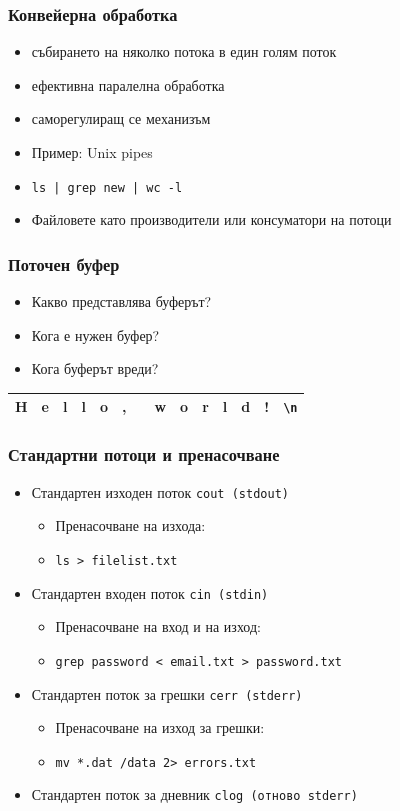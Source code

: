 \documentclass{beamer}
\begin{document}
\begin{frame}
  \frametitle{Конвейерна обработка}

  \begin{itemize}
  \item събирането на няколко потока в един голям поток
  \item ефективна паралелна обработка
  \item саморегулиращ се механизъм
  \item Пример: Unix pipes
  \item \tt{ls | grep new | wc -l}
  \item Файловете като производители или консуматори на потоци
  \end{itemize}
\end{frame}

\begin{frame}
  \frametitle{Поточен буфер}

  \begin{itemize}
  \item Какво представлява буферът?
  \item Кога е нужен буфер?
  \item Кога буферът вреди?
  \end{itemize}
  \vspace{2em}

  \begin{tabular}{|c|c|c|c|c|c|c|c|c|c|c|c|c|c|}
    \rowcolor{blue!60!green!40}
    \hline
    H&e&l&l&o&,& &w&o&r&l&d&!&\tt{\textbackslash n}\\
    \hline
  \end{tabular}
\end{frame}

\begin{frame}
  \frametitle{Стандартни потоци и пренасочване}

  \begin{itemize}
  \item Стандартен изходен поток \tt{cout} (\tt{stdout})
    \begin{itemize}
    \item Пренасочване на изхода:
    \item \tt{ls  > filelist.txt}
    \end{itemize}
  \item Стандартен входен поток \tt{cin} (\tt{stdin})
    \begin{itemize}
    \item Пренасочване на вход и на изход:
    \item \tt{grep password < email.txt > password.txt}
    \end{itemize}
  \item Стандартен поток за грешки \tt{cerr} (\tt{stderr})
    \begin{itemize}
    \item Пренасочване на изход за грешки:
    \item \tt{mv *.dat /data 2> errors.txt}
    \end{itemize}
  \item Стандартен поток за дневник \tt{clog} (отново \tt{stderr})    
  \end{itemize}
\end{frame}
\end{document}
